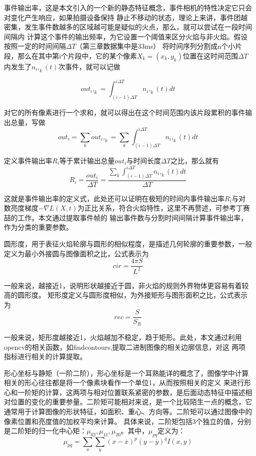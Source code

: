 事件输出率，这是本文引入的一个新的静态特征概念，事件相机的特性决定它只会对变化产生响应，如果拍摄设备保持
静止不移动的状态，理论上来讲，事件团越密集，发生事件数越多的区域越可能是疑似的火点，那么，就可以尝试在一段时间间隔内
计算这个事件的输出频率，为它设置一个阈值来区分火焰与非火焰。假设按照一定的时间间隔$\Delta T$（第三章数据集中是33ms）
将时间序列分割成n个小片段，那么在其中第i个片段中，它的某个像素$X_k=(x_k,y_k)$位置在这时间范围$\Delta T$内发生了$n_i,_k(t)$次事件，就可以记做

\begin{equation} 
    out_i,_k=\int_{(i-1)\Delta T}^{i\Delta T} n_i,_k(t) dt
\end{equation}

对它的所有像素进行一个求和，就可以得出在这个时间范围内该片段累积的事件输出总量，写做
\begin{equation} 
    out_i=\sum_{k}out_i,_k=\sum_{k}\int_{(i-1)\Delta T}^{i\Delta T} n_i,_k(t) dt
\end{equation}


定义事件输出率$R_i$等于累计输出总量$out_i$与时间长度$\Delta T$之比，那么就有
\begin{equation} 
R_i=\frac{out_i}{\Delta T}=\frac{\sum_{k}\int_{(i-1)\Delta T}^{i\Delta T} n_i,_k(t) dt}{\Delta T}
\end{equation}

这就是事件输出率的定义式，此处还可以证明在极短的时间内事件输出率$R_i$与对数亮度梯度$- \nabla L(X,t)$为正比关系，符合火焰特性，这里不再赘述，可参考丁赛喆的工作\cite{ding2023}。本文通过提取事件帧的
输出事件数与分割时间间隔计算事件输出率，作为分类的重要参数。

圆形度，用于表征火焰轮廓与圆形的相似程度，是描述几何轮廓的重要参数，一般定义为最小外接圆与图像面积之比，公式表示为
\begin{equation} 
    cir=\frac{4\pi S}{L^2}
\end{equation}

一般来说，越接近1，说明形状越接近于圆，非火焰的规则外界物体更容易有着较高的圆形度。
矩形度定义与圆形度相似，为外接矩形与图形面积之比，公式表示为
\begin{equation} 
    rec=\frac{S}{S_R}
\end{equation}

一般来说，矩形度越接近1，火焰越加不稳定，趋于矩形。此处，本文通过利用opencv的相关函数，如findcontours,提取二进制图像的相关边廓信息，对这
两项指标进行相关的计算提取。

形心坐标与静矩（一阶二阶），形心坐标是一个耳熟能详的概念了，图像学中计算相关的形心往往都是将一个像素块看作一个单位1，从而按照相关的定义
来进行形心和一阶矩的计算，这两项与相对位置联系紧密的参数，是后面动态特征中描述相对位置的变化的重要参量。二阶矩可能相对来说，是一个比较陌生一点的概念，它通常用于计算图像的形状特征，如面积、重心、方向等。二阶矩可以通过图像中的像素位置和亮度值的加权平均来计算。
具体来说，二阶矩包括3个独立的值，分别是二阶矩的归一化中心矩：$\mu_{02},\mu_{11},\mu_{20}$。其中，$\mu_{pq}$定义为：
\begin{equation} 
    \mu_{pq}=\sum_{x}\sum_{y}(x-\overline{x})^p(y-\overline{y})^qI(x,y)
\end{equation}

